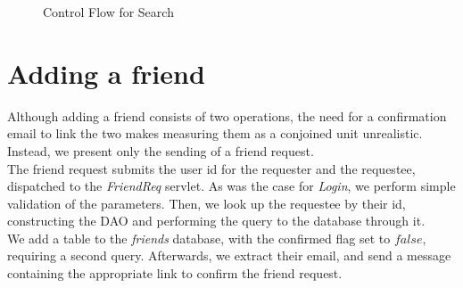 \documentclass[11pt]{report}
\begin{document}
\begin{figure}[!htb]
\caption{Control Flow for Search}
\end{figure}

\section{Adding a friend}
Although adding a friend consists of two operations, the need for a confirmation email to link the two makes measuring them as a conjoined unit unrealistic. Instead, we present only the sending of a friend request. \\

The friend request submits the user id for the requester and the requestee, dispatched to the \emph{FriendReq} servlet. As was the case for \emph{Login}, we perform simple validation of the parameters. Then, we look up the requestee by their id, constructing the DAO and performing the query to the database through it. \\

We add a table to the \emph{friends} database, with the confirmed flag set to $false$, requiring a second query. Afterwards, we extract their email, and send a message containing the appropriate link to confirm the friend request. 
\end{document}
